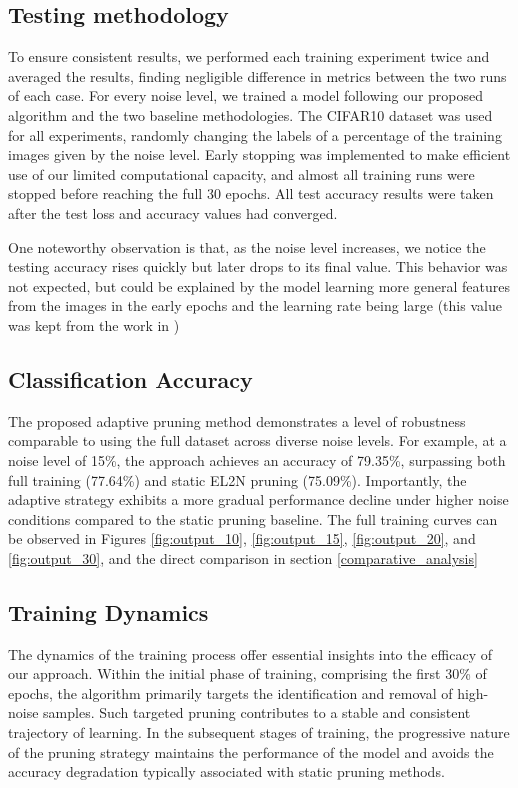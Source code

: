 \documentclass{article}
\begin{document}
\subsection{Testing methodology}

To ensure consistent results, we performed each training experiment twice and averaged the results, finding negligible difference in metrics between the two runs of each case. For every noise level, we trained a model following our proposed algorithm and the two baseline methodologies. The CIFAR10 dataset was used for all experiments, randomly changing the labels of a percentage of the training images given by the noise level.
Early stopping was implemented to make efficient use of our limited computational capacity, and almost all training runs were stopped before reaching the full 30 epochs. All test accuracy results were taken after the test loss and accuracy values had converged.

One noteworthy observation is that, as the noise level increases, we notice the testing accuracy rises quickly but later drops to its final value. This behavior was not expected, but could be explained by the model learning more general features from the images in the early epochs and the learning rate being large (this value was kept from the work in \cite{paul2021})

\subsection{Classification Accuracy}

The proposed adaptive pruning method demonstrates a level of robustness comparable to using the full dataset across diverse noise levels. For example, at a noise level of 15\%, the approach achieves an accuracy of 79.35\%, surpassing both full training (77.64\%) and static EL2N pruning (75.09\%). Importantly, the adaptive strategy exhibits a more gradual performance decline under higher noise conditions compared to the static pruning baseline.
The full training curves can be observed in Figures \ref{fig:output_10}, \ref{fig:output_15}, \ref{fig:output_20}, and \ref{fig:output_30}, and the direct comparison in section \ref{comparative_analysis}

\subsection{Training Dynamics}

The dynamics of the training process offer essential insights into the efficacy of our approach. Within the initial phase of training, comprising the first 30\% of epochs, the algorithm primarily targets the identification and removal of high-noise samples. Such targeted pruning contributes to a stable and consistent trajectory of learning. In the subsequent stages of training, the progressive nature of the pruning strategy maintains the performance of the model and avoids the accuracy degradation typically associated with static pruning methods.
\end{document}
